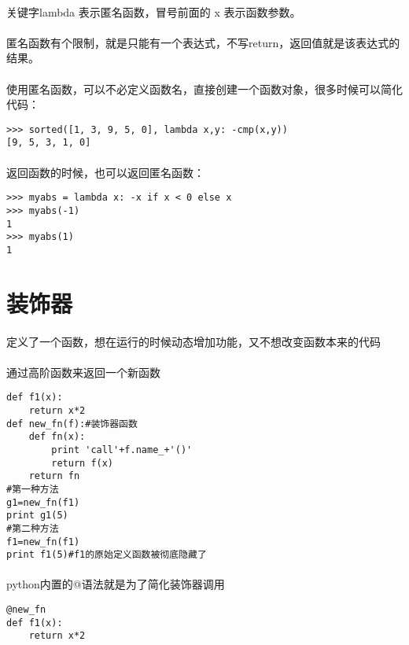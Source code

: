 \documentclass{article}
\begin{document}
\begin{CJK}{UTF8}{gbsn}
\paragraph{}
关键字lambda 表示匿名函数，冒号前面的 x 表示函数参数。
\paragraph{}
匿名函数有个限制，就是只能有一个表达式，不写return，返回值就是该表达式的结果。
\paragraph{}
使用匿名函数，可以不必定义函数名，直接创建一个函数对象，很多时候可以简化代码：
\begin{verbatim}
>>> sorted([1, 3, 9, 5, 0], lambda x,y: -cmp(x,y))
[9, 5, 3, 1, 0]
\end{verbatim}
\paragraph{}
返回函数的时候，也可以返回匿名函数：
\begin{verbatim}
>>> myabs = lambda x: -x if x < 0 else x 
>>> myabs(-1)
1
>>> myabs(1)
1
\end{verbatim}
\section{装饰器}
\paragraph{}
定义了一个函数，想在运行的时候动态增加功能，又不想改变函数本来的代码
\paragraph{}
通过高阶函数来返回一个新函数
\begin{verbatim}
def f1(x):
    return x*2
def new_fn(f):#装饰器函数
    def fn(x):
        print 'call'+f.name_+'()'
        return f(x)
    return fn
#第一种方法
g1=new_fn(f1)
print g1(5)
#第二种方法
f1=new_fn(f1)
print f1(5)#f1的原始定义函数被彻底隐藏了
\end{verbatim}
\paragraph{}
python内置的@语法就是为了简化装饰器调用
\begin{verbatim}
@new_fn
def f1(x):
    return x*2
\end{verbatim}

\end{CJK}
\end{document}
